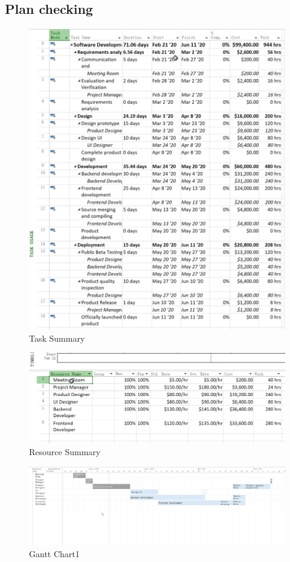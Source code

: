 \documentclass[runningheads]{llncs}
\begin{document}
\subsection{Plan checking}
\begin{figure}[H]
    \centering
    \includegraphics[width=1.0\textwidth]{./image/figure9}
    \caption{Task Summary}
    \label{}
\end{figure}
\begin{figure}[H]
    \centering
    \includegraphics[width=1.0\textwidth]{./image/figure12}
    \caption{Resource Summary}
    \label{}
\end{figure}
\begin{figure}[H]
    \centering
    \includegraphics[width=1.0\textwidth]{./image/figure10}
    \caption{Gantt Chart1}
    \label{}
\end{figure}
\end{document}
